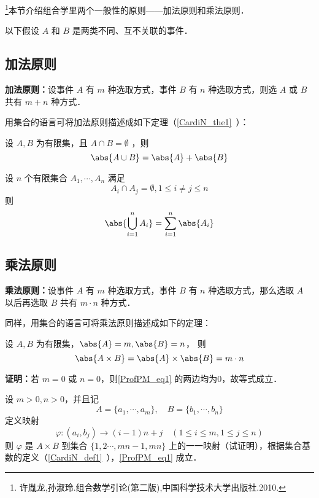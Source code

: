
\footnote{许胤龙,孙淑玲.组合数学引论(第二版),中国科学技术大学出版社.2010.}本节介绍组合学里两个一般性的原则——加法原则和乘法原则．

以下假设 $A$ 和 $B$ 是两类不同、互不关联的事件．
\subsection{加法原则}
\textbf{加法原则：}设事件 $A$ 有 $m$ 种选取方式，事件 $B$ 有 $n$ 种选取方式，则选 $A$ 或 $B$ 共有 $m+n$ 种方式．

用集合的语言可将加法原则描述成如下定理（\autoref{CardiN_the1}~）：
\begin{theorem}{}
设 $A,B$ 为有限集，且 $A\cap B=\emptyset$ ，则
\begin{equation}
\abs{A\cup B}=\abs{A}+\abs{B}
\end{equation}
\end{theorem}
\begin{corollary}{}
设 $n$ 个有限集合 $A_1,\cdots,A_n$ 满足
\begin{equation}
A_i\cap A_j=\emptyset,1\leq i\neq j\leq n
\end{equation}
则
\begin{equation}
\abs{\bigcup_{i=1}^n A_i}=\sum_{i=1}^n\abs{A_i}
\end{equation}

\end{corollary}
\subsection{乘法原则}
\textbf{乘法原则：}设事件 $A$ 有 $m$ 种选取方式，事件 $B$ 有 $n$ 种选取方式，那么选取 $A$ 以后再选取 $B$ 共有 $m\cdot n$ 种方式．

同样，用集合的语言可将乘法原则描述成如下的定理：
\begin{theorem}{}\label{ProfPM_the1}
设 $A,B$ 为有限集，$\abs{A}=m,\abs{B}=n$， 则
\begin{equation}\label{ProfPM_eq1}
\abs{A\times B}=\abs{A}\times\abs{B}=m\cdot n
\end{equation}
\end{theorem}
\textbf{证明：}若 $m=0$ 或 $n=0$，则\autoref{ProfPM_eq1} 的两边均为0，故等式成立．

设 $m>0,n>0$，并且记
\begin{equation}
A=\{a_1,\cdots,a_m\},\quad B=\{b_1,\cdots,b_n\}
\end{equation}
定义映射
\begin{equation}
\varphi:(a_i,b_j)\rightarrow (i-1)n+j\quad (1\leq i\leq m,1\leq j\leq n)
\end{equation}
则 $\varphi$ 是 $A\times B$ 到集合 $\{1,2\cdots,mn-1,mn\}$ 上的一一映射（试证明），根据集合基数的定义（\autoref{CardiN_def1}~），\autoref{ProfPM_eq1} 成立．

